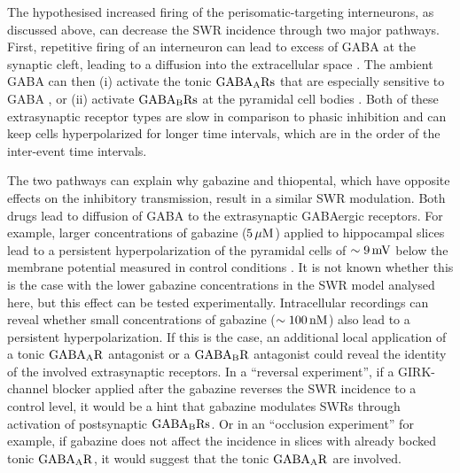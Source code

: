       The hypothesised increased firing of the perisomatic-targeting
      interneurons, as discussed above, can decrease the SWR incidence through
      two major pathways. First, repetitive firing of an interneuron can lead
      to excess of GABA at the synaptic cleft, leading to a diffusion into the
      extracellular space \citep{Farrant2005}. The ambient GABA can then (i)
      activate the tonic $\rm GABA_ARs$ that are especially sensitive to GABA
      \citep{Semyanov2004}, or (ii) activate $\rm GABA_BRs$ at the pyramidal
      cell bodies \citep{Scanziani2000}. Both of these extrasynaptic receptor
      types are slow in comparison to phasic inhibition and can keep cells
      hyperpolarized for longer time intervals, which are in the order of the
      inter-event time intervals. 
      
      The two pathways can explain why gabazine and thiopental, which have
      opposite effects on the inhibitory transmission, result in a similar SWR
      modulation. Both drugs lead to diffusion of GABA to the extrasynaptic
      GABAergic receptors. For example, larger concentrations of gabazine
      ($5\,\rm \mu M$) applied to hippocampal slices lead to a persistent
      hyperpolarization of the pyramidal cells of $\sim 9\, \rm mV$ below the
      membrane potential measured in control conditions \citep{Behrens2007}. It
      is not known whether this is the case with the lower gabazine
      concentrations in the SWR model analysed here, but this effect can be
      tested experimentally. Intracellular recordings can reveal whether small
      concentrations of gabazine ($\sim 100 \, \rm nM$) also lead to a
      persistent hyperpolarization. If this is the case, an additional local
      application of a tonic $\rm GABA_AR$ antagonist \citep[e.g.,
      DPP-4-PIO;][]{Boddum2014} or a $\rm GABA_BR$ antagonist could reveal the
      identity of the involved extrasynaptic receptors. In a ``reversal
      experiment'', if a GIRK-channel blocker applied after the gabazine
      reverses the SWR incidence to a control level, it would be a hint that
      gabazine modulates SWRs through activation of postsynaptic $\rm
      GABA_BRs$. Or in an ``occlusion experiment'' for example, if gabazine does
      not affect the incidence in slices with already bocked tonic $\rm
      GABA_AR$, it would suggest that the tonic $\rm GABA_AR$ are involved.

